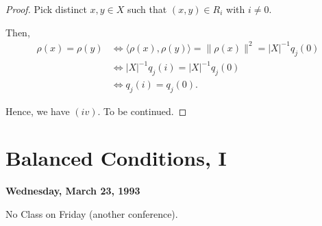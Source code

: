 \documentclass[
]{book}
\theoremstyle{definition}
\theoremstyle{definition}
\theoremstyle{definition}
\theoremstyle{definition}
\theoremstyle{remark}
\begin{document}
\begin{proof}
Pick distinct \(x,y\in X\) such that \((x,y)\in R_i\) with \(i\neq 0\).

Then,
\begin{align}
\rho(x) = \rho(y) & \Leftrightarrow \langle \rho(x),\rho(y)\rangle = \|\rho(x)\|^2 = |X|^{-1}q_j(0)\\
& \Leftrightarrow |X|^{-1}q_j(i) = |X|^{-1}q_j(0)\\
& \Leftrightarrow q_j(i) = q_j(0).
\end{align}

Hence, we have \((iv)\). To be continued.

\end{proof}

\hypertarget{lec24}{%
\chapter{Balanced Conditions, I}\label{lec24}}

\textbf{Wednesday, March 23, 1993}

No Class on Friday (another conference).
\end{document}
